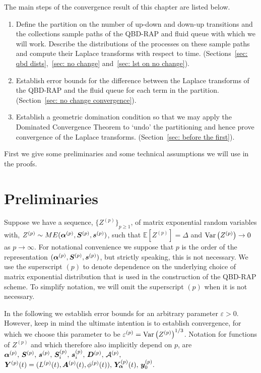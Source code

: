 The main steps of the convergence result of this chapter are listed below.
\begin{enumerate}
	\item\label{step 1} Define the partition on the number of up-down and down-up transitions and the collections sample paths of the QBD-RAP and fluid queue with which we will work. Describe the distributions of the processes on these sample paths and compute their Laplace transforms with respect to time. (Sections~\ref{sec: qbd dists},~\ref{sec: no change} and~\ref{sec: lst on no change}).
	\item\label{step 2} Establish error bounds for the difference between the Laplace transforms of the QBD-RAP and the fluid queue for each term in the partition. (Section~\ref{sec: no change convergence}).
	\item\label{step 3} Establish a geometric domination condition so that we may apply the Dominated Convergence Theorem to `undo' the partitioning and hence prove convergence of the Laplace transforms. (Section~\ref{sec: before the first}).
\end{enumerate}

First we give some preliminaries and some technical assumptions we will use in the proofs. 

\section*{Preliminaries}
Suppose we have a sequence, \(\{Z^{(p)}\}_{p\geq 1}\), of matrix exponential random variables with, \(Z^{(p)}\sim ME(\boldsymbol\alpha^{(p)},\boldsymbol S^{(p)}, \boldsymbol s^{(p)})\), such that \(\mathbb E[Z^{(p)}] = \Delta\) and \(\mathrm{Var}\left(Z^{(p)}\right)\to 0 \) as \(p\to \infty\). For notational convenience we suppose that \(p\) is the order of the representation \((\boldsymbol\alpha^{(p)},\boldsymbol S^{(p)}, \boldsymbol s^{(p)})\), but strictly speaking, this is not necessary. We use the superscript \((p)\) to denote dependence on the underlying choice of matrix exponential distribution that is used in the construction of the QBD-RAP scheme. To simplify notation, we will omit the superscript \((p)\) when it is not necessary. 

In the following we establish error bounds for an arbitrary parameter \(\varepsilon>0\). However, keep in mind the ultimate intention is to establish convergence, for which we choose this parameter to be \(\varepsilon^{(p)}=\mathrm{Var}\left(Z^{(p)}\right)^{1/3}\). Notation for functions of \(Z^{(p)}\) and which therefore also implicitly depend on \(p\), are \(\boldsymbol\alpha^{(p)},\,\boldsymbol S^{(p)},\,\boldsymbol s^{(p)},\, \boldsymbol S_i^{(p)},\, \boldsymbol s_i^{(p)},\, \boldsymbol D^{(p)},\,\mathcal A^{(p)},\) \(\boldsymbol Y^{(p)}(t) = (L^{(p)}(t),\boldsymbol A^{(p)}(t), \phi^{(p)}(t)),\, \bm{Y}_{\bm{\alpha}}^{(p)}(t),\, \boldsymbol y_0^{(p)}.\)

